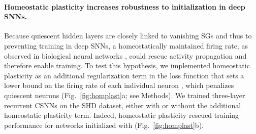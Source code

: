 \documentclass[11pt,a4paper]{article}
\begin{document}
\paragraph{Homeostatic plasticity increases robustness to initialization in deep \acp{SNN}.}
Because quiescent hidden layers are closely linked to vanishing \acp{SG} and thus to preventing training in deep \acp{SNN}, a homeostatically maintained firing rate, as observed in biological neural networks \cite{turrigiano_homeostatic_2012, gjorgjieva_homeostatic_2016, zenke_hebbian_2017}, could rescue activity propagation and therefore enable training. 
To test this hypothesis, we implemented homeostatic plasticity as an additional regularization term in the loss function that sets a lower bound on the firing rate of each individual neuron \citealp{cramer_heidelberg_2020}, which penalizes quiescent neurons (Fig.~\ref{fig:homplast}a; see Methods). 
We trained three-layer recurrent \acp{CSNN} on the SHD dataset, either with or without the additional homeostatic plasticity term. 
Indeed, homeostatic plasticity rescued training performance for networks initialized with  (Fig.~\ref{fig:homplast}b). 
\end{document}
